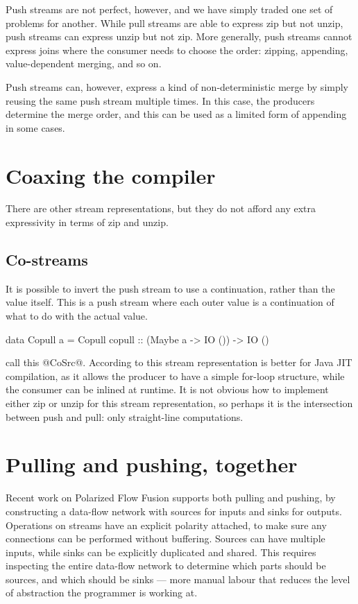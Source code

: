 Push streams are not perfect, however, and we have simply traded one set of problems for another.
While pull streams are able to express zip but not unzip, push streams can express unzip but not zip.
More generally, push streams cannot express joins where the consumer needs to choose the order: zipping, appending, value-dependent merging, and so on.

Push streams can, however, express a kind of non-deterministic merge by simply reusing the same push stream multiple times.
In this case, the producers determine the merge order, and this can be used as a limited form of appending in some cases.

\section{Coaxing the compiler}
\label{sec:process:streams:coaxing}
There are other stream representations, but they do not afford any extra expressivity in terms of zip and unzip.

\subsection{Co-streams}
It is possible to invert the push stream to use a continuation, rather than the value itself.
This is a push stream where each outer value is a continuation of what to do with the actual value.

\begin{code}
data Copull a
  = Copull
  { copull :: (Maybe a -> IO ()) -> IO () }
\end{code}

\citet{bernardy2015duality} call this @CoSrc@.
According to \citet{biboudis2017expressive} this stream representation is better for Java JIT compilation, as it allows the producer to have a simple for-loop structure, while the consumer can be inlined at runtime.
It is not obvious how to implement either zip or unzip for this stream representation, so perhaps it is the intersection between push and pull: only straight-line computations.


\section{Pulling and pushing, together}

Recent work on Polarized Flow Fusion \citep{lippmeier2016polarized} supports both pulling and pushing, by constructing a data-flow network with sources for inputs and sinks for outputs.
Operations on streams have an explicit polarity attached, to make sure any connections can be performed without buffering.
Sources can have multiple inputs, while sinks can be explicitly duplicated and shared.
This requires inspecting the entire data-flow network to determine which parts should be sources, and which should be sinks --- more manual labour that reduces the level of abstraction the programmer is working at.

